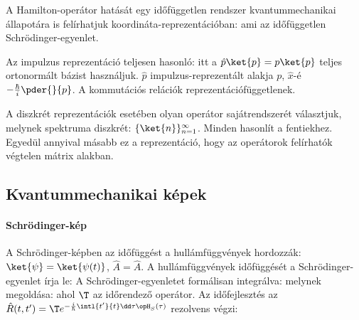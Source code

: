    A Hamilton-operátor hatását egy időfüggetlen rendszer kvantummechanikai állapotára is felírhatjuk koordináta-reprezentációban:
   ami az időfüggetlen Schrödinger-egyenlet. 
   
   Az impulzus reprezentáció teljesen hasonló: itt a $\hat{p}\ket{p}=p\ket{p}$ teljes ortonormált bázist használjuk. $\hat{p}$ impulzus-reprezentált alakja $p$, $\hat{x}$-é $-\frac{\hbar}{i}\pder{}{p}$.
   A kommutációs relációk reprezentációfüggetlenek. 
   
   A diszkrét reprezentációk esetében olyan operátor sajátrendszerét választjuk, melynek spektruma diszkrét: $\{\ket{n}\}_{n=1}^{\infty}$.
   Minden hasonlít a fentiekhez.
   Egyedül annyival másabb ez a reprezentáció, hogy az operátorok felírhatók végtelen mátrix alakban. 
   
  \subsection{Kvantummechanikai képek}
   
   \paragraph{Schrödinger-kép}
    
    A Schrödinger-képben az időfüggést a hullámfüggvények hordozzák: $\ket{\psi}=\ket{\psi(t)}$, $\hat{A}=\hat{A}$.
   A hullámfüggvények időfüggését a Schrödinger-egyenlet írja le:
    A Schrödinger-egyenletet formálisan integrálva:
    melynek megoldása:
    ahol $\T$ az időrendező operátor.
   Az időfejlesztés az $\hat{R}(t,t')=\T e^{-\frac{i}{\hbar}\intl{t'}{t}\dd \tau \opH_S(\tau)}$ rezolvens végzi:
    
